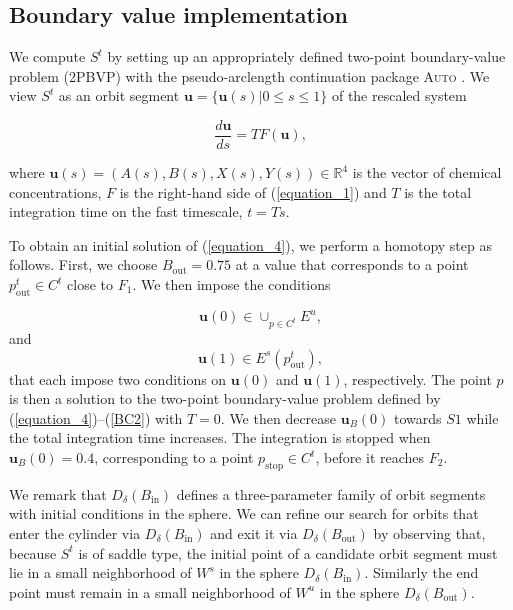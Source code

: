 \documentclass{ws-ijbc}
\begin{document}
\subsection{Boundary value implementation}
    
We compute $S^t$ by setting up an appropriately defined two-point boundary-value problem (2PBVP) with the pseudo-arclength continuation package \textsc{Auto} \cite{AUTO}.  We view $S^t$ as an orbit segment $\mathbf{u} = \{\mathbf{u}(s)| 0 \leq s \leq 1 \}$ of the rescaled system


\begin{equation}
\frac{d\mathbf{u}}{ds} = TF(\mathbf{u}),
\label{equation_4}
\end{equation}
    
\noindent
where $\mathbf{u}(s) = (A(s), B(s), X(s), Y(s)) \in \mathbb{R}^4$ is the vector of chemical concentrations, $F$ is the right-hand side of (\ref{equation_1}) and $T$ is the total integration time on the fast timescale, $t=Ts$.
    
To obtain an initial solution of (\ref{equation_4}), we perform a homotopy step as follows.  First, we choose $B_{\mathrm{out}} = 0.75$ at a value that corresponds to a point $p^t_{\mathrm{out}} \in C^t$ close to $F_1$.  We then impose the conditions
    
\begin{equation}
\mathbf{u}(0) \in \cup_{p \in C^t} E^u,
\label{BC3}
\end{equation}
and
\begin{equation}
\mathbf{u}(1) \in E^s(p^t_{\mathrm{out}}),
\label{BC2}
\end{equation}
\noindent
that each impose two conditions on $\mathbf{u}(0)$ and $\mathbf{u}(1)$, respectively.  The point $p$ is then a solution to the two-point boundary-value problem defined by (\ref{equation_4})--(\ref{BC2}) with $T=0$.  We then  decrease $\mathbf{u}_B(0)$ towards $S1$ while the total integration time increases.  The integration is stopped when $\mathbf{u}_B(0)=0.4$, corresponding to a point $p_{\text{stop}} \in C^t$, before it reaches $F_2$.
    
We remark that $D_\delta(B_{\mathrm{in}})$ defines a three-parameter family of orbit segments with initial conditions in the sphere.  We can refine our search for orbits that enter the cylinder via $D_\delta(B_{\mathrm{in}})$ and exit it via $D_\delta(B_{\mathrm{out}})$ by observing that, because $S^t$ is of saddle type, the initial point of a candidate orbit segment must lie in a small neighborhood of $W^s$ in the sphere $D_\delta(B_{\mathrm{in}})$.  Similarly the end point must remain in a small neighborhood of $W^u$ in the sphere $D_\delta(B_{\mathrm{out}})$.
    
\end{document}
